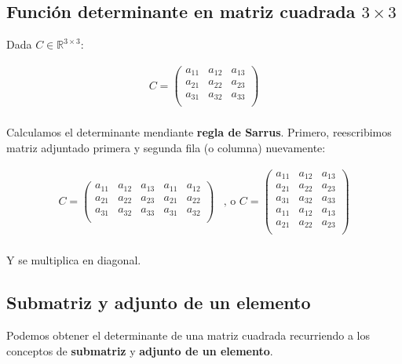 \documentclass[12pt]{article}
\begin{document}
\subsection{Función determinante en matriz cuadrada \(3 \times 3\)}

Dada \(C \in \mathbb{R}^{3 \times 3}\):

\begin{align*}
  C = \begin{pmatrix}
        a_{11} & a_{12} & a_{13} \\
        a_{21} & a_{22} & a_{23} \\
        a_{31} & a_{32} & a_{33} \\
      \end{pmatrix} \\
\end{align*}

Calculamos el determinante mendiante \textbf{regla de Sarrus}.
Primero,
reescribimos matriz adjuntado primera y segunda fila (o columna) nuevamente:

\begin{align*}
  C = \begin{pmatrix}
        a_{11} & a_{12} & a_{13} & a_{11} & a_{12} \\
        a_{21} & a_{22} & a_{23} & a_{21} & a_{22} \\
        a_{31} & a_{32} & a_{33} & a_{31} & a_{32} \\
      \end{pmatrix}
   & \text{, o }
  C = \begin{pmatrix}
        a_{11} & a_{12} & a_{13} \\
        a_{21} & a_{22} & a_{23} \\
        a_{31} & a_{32} & a_{33} \\
        a_{11} & a_{12} & a_{13} \\
        a_{21} & a_{22} & a_{23} \\
      \end{pmatrix} \\
\end{align*}

Y se multiplica en diagonal.

\subsection{Submatriz y adjunto de un elemento}

Podemos obtener el determinante de una matriz cuadrada recurriendo
a los conceptos de \textbf{submatriz} y \textbf{adjunto de un elemento}.
\end{document}
